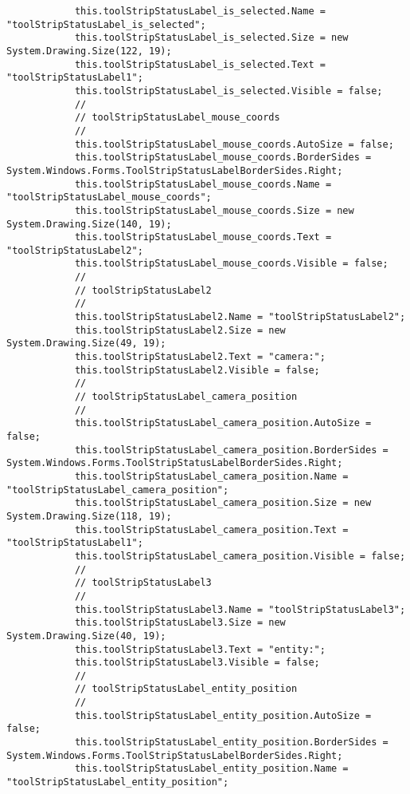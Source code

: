 \begin{scriptsize}
\begin{verbatim}
            this.toolStripStatusLabel_is_selected.Name = "toolStripStatusLabel_is_selected";
            this.toolStripStatusLabel_is_selected.Size = new System.Drawing.Size(122, 19);
            this.toolStripStatusLabel_is_selected.Text = "toolStripStatusLabel1";
            this.toolStripStatusLabel_is_selected.Visible = false;
            // 
            // toolStripStatusLabel_mouse_coords
            // 
            this.toolStripStatusLabel_mouse_coords.AutoSize = false;
            this.toolStripStatusLabel_mouse_coords.BorderSides = System.Windows.Forms.ToolStripStatusLabelBorderSides.Right;
            this.toolStripStatusLabel_mouse_coords.Name = "toolStripStatusLabel_mouse_coords";
            this.toolStripStatusLabel_mouse_coords.Size = new System.Drawing.Size(140, 19);
            this.toolStripStatusLabel_mouse_coords.Text = "toolStripStatusLabel2";
            this.toolStripStatusLabel_mouse_coords.Visible = false;
            // 
            // toolStripStatusLabel2
            // 
            this.toolStripStatusLabel2.Name = "toolStripStatusLabel2";
            this.toolStripStatusLabel2.Size = new System.Drawing.Size(49, 19);
            this.toolStripStatusLabel2.Text = "camera:";
            this.toolStripStatusLabel2.Visible = false;
            // 
            // toolStripStatusLabel_camera_position
            // 
            this.toolStripStatusLabel_camera_position.AutoSize = false;
            this.toolStripStatusLabel_camera_position.BorderSides = System.Windows.Forms.ToolStripStatusLabelBorderSides.Right;
            this.toolStripStatusLabel_camera_position.Name = "toolStripStatusLabel_camera_position";
            this.toolStripStatusLabel_camera_position.Size = new System.Drawing.Size(118, 19);
            this.toolStripStatusLabel_camera_position.Text = "toolStripStatusLabel1";
            this.toolStripStatusLabel_camera_position.Visible = false;
            // 
            // toolStripStatusLabel3
            // 
            this.toolStripStatusLabel3.Name = "toolStripStatusLabel3";
            this.toolStripStatusLabel3.Size = new System.Drawing.Size(40, 19);
            this.toolStripStatusLabel3.Text = "entity:";
            this.toolStripStatusLabel3.Visible = false;
            // 
            // toolStripStatusLabel_entity_position
            // 
            this.toolStripStatusLabel_entity_position.AutoSize = false;
            this.toolStripStatusLabel_entity_position.BorderSides = System.Windows.Forms.ToolStripStatusLabelBorderSides.Right;
            this.toolStripStatusLabel_entity_position.Name = "toolStripStatusLabel_entity_position";

\end{verbatim}
\end{scriptsize}
